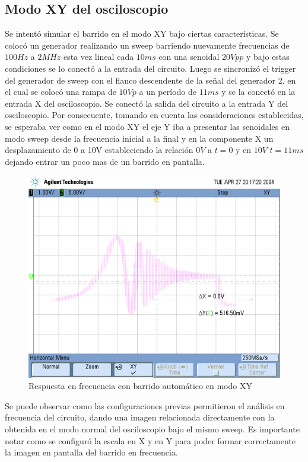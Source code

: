 \subsection{Modo XY del osciloscopio}

Se intentó simular el barrido en el modo XY bajo ciertas características.
Se colocó un generador realizando un sweep barriendo nuevamente frecuencias de $100Hz$ a $2MHz$ esta vez lineal cada $10ms$ con una senoidal
$20Vpp$ y bajo estas condiciones se lo conectó a la entrada del circuito.
Luego se sincronizó el trigger del generador de sweep con el flanco
descendente de la señal del generador 2, en el cual se colocó una
rampa de $10Vp$ a un período de $11ms$ y se la conectó en la entrada
X del osciloscopio. Se conectó la salida del circuito a la entrada
Y del osciloscopio. Por consecuente, tomando en cuenta las consideraciones
establecidas, se esperaba ver como en el modo XY el eje Y iba a presentar
las senoidales en modo sweep desde la frecuencia inicial a la final
y en la componente X un desplazamiento de 0 a 10V estableciendo la
relación $0V$ a $t=\text{0}$ y en $10V$ $t=11ms$ dejando entrar
un poco mas de un barrido en pantalla.
\begin{figure}[H]
\centering{}\includegraphics{./scope_24.png}\caption{Respuesta en frecuencia con barrido automático en modo XY}
\end{figure}

Se puede observar como las configuraciones previas permitieron el
análisis en frecuencia del circuito, dando una imagen relacionada
directamente con la obtenida en el modo normal del osciloscopio bajo
el mismo sweep. Es importante notar como se configuró la escala en
X y en Y para poder formar correctamente la imagen en pantalla del
barrido en frecuencia.

